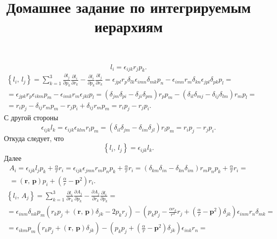 \documentclass[a4paper]{article}
\title{Домашнее задание по интегрируемым иерархиям}
\begin{document}
	\maketitle
\begin{hiProb}[Упражнение 1.0]
\end{hiProb}
\begin{sol}
\[
l_i=\epsilon _{ijk} r_j p_k
.\] 
\begin{multline*}
\left\{ l_i,\,l_j \right\} =\sum_{k=1}^{3} 
\frac{\partial l_j}{\partial p_k} 
\frac{\partial l_i}{\partial r_k} -\frac{\partial l_i}{\partial p_k} \frac{\partial l_j}{\partial r_k}=
\epsilon _{jpl}r_p \delta_{lk}
\epsilon _{imn}\delta_{m k}p_n -\epsilon _{imn}r_m \delta_{kn}
\epsilon _{jpl}\delta_{pk}p_l =\\=
\epsilon _{jpk}r_p \epsilon _{ikm}p_m-\epsilon _{imk} r_m \epsilon _{jkl}p_l
=
(\delta_{jm}\delta_{pi}-\delta_{ji}\delta_{pm})r_pp_m-(\delta_{il}\delta_{mj}-\delta_{ij}\delta_{lm})r_mp_l
=
\\=r_ip_j-\delta_{ij}r_mp_m-r_jp_i+\delta_{ij}r_mp_m =
r_i p_j-r_j p_i
.\end{multline*} 
С другой стороны
\[
\epsilon _{ijk}l_k =\epsilon _{ijk}\epsilon _{klm}r_l p_m=
(\delta_{il}\delta_{jm}-\delta_{im}\delta_{jl})r_l p_m=
r_i p_j-r_jp_i
.\] 
Откуда следует, что
\[
\left\{ l_i,\,l_j \right\} =\epsilon _{ijk}l_k
.\] 
Далее
\begin{multline*}
A_i= \epsilon _{ijk} l_j p_k + \frac{\alpha}{r}r_i=
\epsilon _{ijk} \epsilon _{jmn}r_m p_n p_k +\frac{\alpha}{r}
r_i=
(\delta_{km}\delta_{in}-\delta_{kn}\delta_{im})
r_m p_n p_k+ \frac{\alpha}{r}r_i=
\\=(\mathbf{r},\,\mathbf{p})p_i+\left(\frac{\alpha}{r}-\mathbf{p}^2\right)r_i
.\end{multline*} 
\begin{multline*}
\left\{ l_i,\,A_j \right\} =
\sum_{k=1}^{3} \frac{\partial l_i}{\partial r_k} 
\frac{\partial A_j}{\partial p_k}-
\frac{\partial A_j}{\partial r_k} \frac{\partial l_i}{\partial p_k} =\\=
\epsilon _{inm}\delta_{nk} p_m
\left(r_k p_j+(\mathbf{r},\,\mathbf{p})\delta_{jk}-2p_k r_j\right)-
\left(p_kp_j - \frac{\alpha r_k}{r^3}r_j+\left(\frac{\alpha}{r}-\mathbf{p}^2\right) \delta_{jk} \right) 
\epsilon_{inm}r_n \delta_{m k }=\\
=\epsilon _{ikm} p_m
\left(r_k p_j+(\mathbf{r},\,\mathbf{p})\delta_{jk}\right)-
\left(p_kp_j +\left(\frac{\alpha}{r}-\mathbf{p}^2\right) \delta_{jk} \right) 
\epsilon_{ink}r_n =\\

\end{multline*}
\end{sol}
\end{document}
